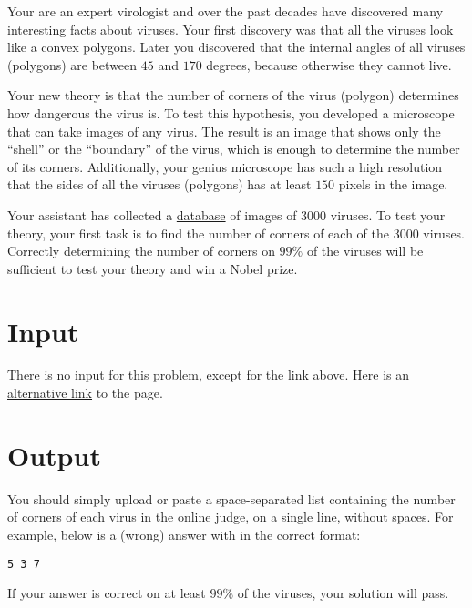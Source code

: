 Your are an expert virologist and over the past decades have discovered many interesting facts about viruses.
Your first discovery was that all the viruses look like a convex polygons.
Later you discovered that the internal angles of all viruses (polygons) are between $45$ and $170$ degrees, because otherwise they cannot live.

Your new theory is that the number of corners of the virus (polygon) determines how dangerous the virus is.
To test this hypothesis, you developed a microscope that can take images of any virus.
The result is an image that shows only the ``shell'' or the ``boundary'' of the virus, which is enough to determine the number of its corners.
Additionally, your genius microscope has such a high resolution that the sides of all the viruses (polygons) has at least $150$ pixels in the image.

Your assistant has collected a \href{http://ejudge.rau.am/ejudge/virus-shapes.zip}{database} of images of $3000$ viruses.
To test your theory, your first task is to find the number of corners of each of the $3000$ viruses.
Correctly determining the number of corners on $99\%$ of the viruses will be sufficient to test your theory and win a Nobel prize.

\section*{Input}
There is no input for this problem, except for the link above.
Here is an \href{http://ejudge.rau.am/ejudge/virus-shapes.zip}{alternative link} to the page.

\section*{Output}
You should simply upload or paste a space-separated list containing the number of corners of each virus in the online judge, on a single line, without spaces.
For example, below is a (wrong) answer with in the correct format:
\begin{center}
    \texttt{5 3 7}
\end{center}
If your answer is correct on at least $99\%$ of the viruses, your solution will pass.

%
%
%
